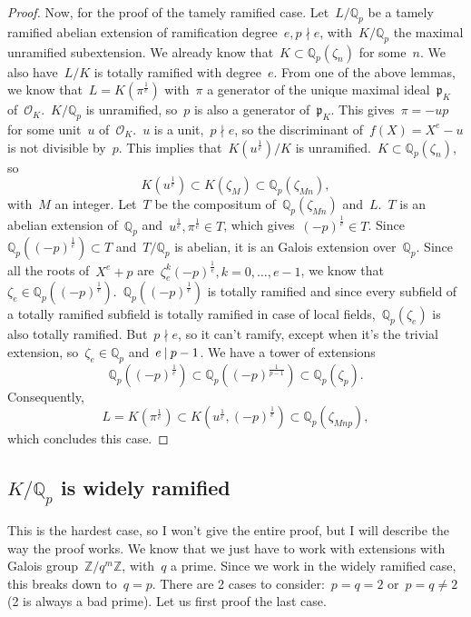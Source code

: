 \begin{proof}
  Now, for the proof of the tamely ramified case. Let~$L/\mathbb{Q}_p$ be a tamely ramified abelian extension of ramification degree~$e, p\nmid e$, with~$K/\mathbb{Q}_p$ the maximal unramified subextension. We already know that~$K \subset \mathbb{Q}_p(\zeta_n)$ for some~$n$. We also have~$L/K$ is totally ramified with degree~$e$. From one of the above lemmas, we know that~$L = K(\pi^{\frac{1}{e}})$ with~$\pi$ a generator of the unique maximal ideal~$\mathfrak{p}_K$ of~$\mathcal{O}_K$.~$K/\mathbb{Q}_p$ is unramified, so~$p$ is also a generator of~$\mathfrak{p}_K$. This gives~$\pi = -up$ for some unit~$u$ of~$\mathcal{O}_K$.~$u$ is a unit,~$p \nmid e$, so the discriminant of~$f(X) = X^e-u$ is not divisible by~$p$. This implies that~$K(u^{\frac{1}{e}})/K$ is unramified.~$K \subset \mathbb{Q}_p(\zeta_n)$, so
  \begin{equation}
    K(u^{\frac{1}{e}}) \subset K(\zeta_M) \subset \mathbb{Q}_p(\zeta_{Mn}), 
  \end{equation}
  with~$M$ an integer. Let~$T$ be the compositum of~$\mathbb{Q}_p(\zeta_{Mn})$ and~$L$.~$T$ is an abelian extension of~$\mathbb{Q}_p$ and~$u^{\frac{1}{e}},\pi^{\frac{1}{e}} \in T$, which gives~$(-p)^{\frac{1}{e}} \in T$. Since~$\mathbb{Q}_p((-p)^{\frac{1}{e}}) \subset T$ and~$T/\mathbb{Q}_p$ is abelian, it is an Galois extension over~$\mathbb{Q}_p$. Since all the roots of~$X^e +p$ are~$\zeta_e^k (-p)^{\frac{1}{e}}, k=0,\ldots,e-1$, we know that~$\zeta_e \in \mathbb{Q}_p((-p)^{\frac{1}{e}})$.~$\mathbb{Q}_p((-p)^{\frac{1}{e}})$ is totally ramified and since every subfield of a totally ramified subfield is totally ramified in case of local fields,~$\mathbb{Q}_p(\zeta_e)$ is also totally ramified. But~$p \nmid e$, so it can't ramify, except when it's the trivial extension, so~$\zeta_e \in \mathbb{Q}_p$ and~$e \mathbin{|} p-1$. We have a tower of extensions
  \begin{equation}
    \mathbb{Q}_p((-p)^{\frac{1}{e}}) \subset \mathbb{Q}_p((-p)^{\frac{1}{p-1}}) \subset \mathbb{Q}_p(\zeta_p). 
  \end{equation}
  Consequently,
  \begin{equation}
    L = K(\pi^{\frac{1}{e}}) \subset K(u^{\frac{1}{e}},(-p)^{\frac{1}{e}}) \subset \mathbb{Q}_p(\zeta_{Mnp}), 
  \end{equation}
  which concludes this case.
\end{proof}

\subsection{$K/\mathbb{Q}_p$ is widely ramified}
This is the hardest case, so I won't give the entire proof, but I will describe the way the proof works. We know that we just have to work with extensions with Galois group~$\mathbb{Z}/q^{m}\mathbb{Z}$, with~$q$ a prime. Since we work in the widely ramified case, this breaks down to~$q = p$. There are 2 cases to consider:~$p = q = 2$ or~$p = q \neq 2$ (2 is always a bad prime). Let us first proof the last case.

